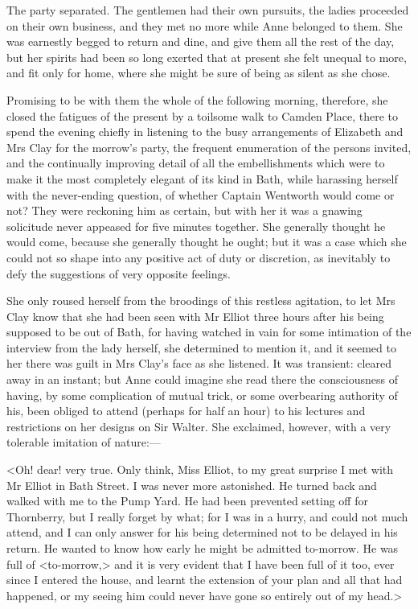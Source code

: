 The party separated. The gentlemen had their own pursuits, the ladies proceeded on their own business, and they met no more while Anne belonged to them. She was earnestly begged to return and dine, and give them all the rest of the day, but her spirits had been so long exerted that at present she felt unequal to more, and fit only for home, where she might be sure of being as silent as she chose.

Promising to be with them the whole of the following morning, therefore, she closed the fatigues of the present by a toilsome walk to Camden Place, there to spend the evening chiefly in listening to the busy arrangements of Elizabeth and Mrs Clay for the morrow's party, the frequent enumeration of the persons invited, and the continually improving detail of all the embellishments which were to make it the most completely elegant of its kind in Bath, while harassing herself with the never-ending question, of whether Captain Wentworth would come or not? They were reckoning him as certain, but with her it was a gnawing solicitude never appeased for five minutes together. She generally thought he would come, because she generally thought he ought; but it was a case which she could not so shape into any positive act of duty or discretion, as inevitably to defy the suggestions of very opposite feelings.

She only roused herself from the broodings of this restless agitation, to let Mrs Clay know that she had been seen with Mr Elliot three hours after his being supposed to be out of Bath, for having watched in vain for some intimation of the interview from the lady herself, she determined to mention it, and it seemed to her there was guilt in Mrs Clay's face as she listened. It was transient: cleared away in an instant; but Anne could imagine she read there the consciousness of having, by some complication of mutual trick, or some overbearing authority of his, been obliged to attend (perhaps for half an hour) to his lectures and restrictions on her designs on Sir Walter. She exclaimed, however, with a very tolerable imitation of nature:—

<Oh! dear! very true. Only think, Miss Elliot, to my great surprise I met with Mr Elliot in Bath Street. I was never more astonished. He turned back and walked with me to the Pump Yard. He had been prevented setting off for Thornberry, but I really forget by what; for I was in a hurry, and could not much attend, and I can only answer for his being determined not to be delayed in his return. He wanted to know how early he might be admitted to-morrow. He was full of <to-morrow,> and it is very evident that I have been full of it too, ever since I entered the house, and learnt the extension of your plan and all that had happened, or my seeing him could never have gone so entirely out of my head.>